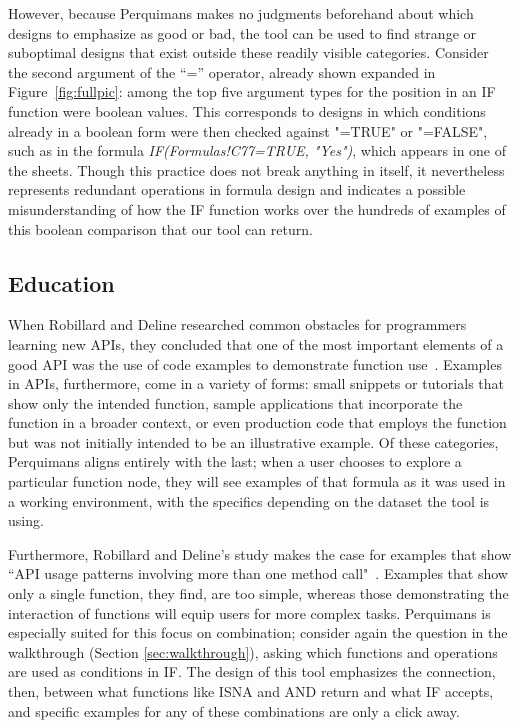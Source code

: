 \documentclass[conference]{IEEEtran}
\newcommand{\toolname}{Perquimans } \newcommand{\toolnameend}{Perquimans}
\begin{document}
	However, because \toolname makes no judgments beforehand about which designs to
	emphasize as good or bad, the tool can be used to find strange or suboptimal
	designs that exist outside these readily visible categories. Consider the second
	argument of the ``='' operator, already shown expanded in
	Figure~\ref{fig:fullpic}: among the top five argument types for the position in
	an IF function were boolean values. This corresponds to designs in which
	conditions already in a boolean form were then checked against "=TRUE" or
	"=FALSE", such as in the formula \textit{IF(Formulas!C77=TRUE, "Yes")}, which
	appears in one of the sheets. Though this practice does not break anything in
	itself, it nevertheless represents redundant operations in formula design and
	indicates a possible misunderstanding of how the IF function works over the
	hundreds of examples of this boolean comparison that our tool can return.
	
	\subsection{Education} When Robillard and Deline researched common obstacles
	for programmers learning new APIs, they concluded that one of the most
	important elements of a good API was the use of code examples to demonstrate
	function use~\cite{robillard2011field}. Examples in APIs, furthermore, come in a variety of forms: small
	snippets or tutorials that show only the intended function, sample applications
	that incorporate the function in a broader context, or even production code
	that employs the function but was not initially intended to be an illustrative
	example. Of these categories, \toolname aligns
	entirely with the last; when a user chooses to explore a particular function
	node, they will see examples of that formula as it was used in a working
	environment, with the specifics depending on the dataset the tool is using.
	\par
	
	Furthermore, Robillard and Deline's study makes the case for examples that show
	``API usage patterns involving more than one method call"~\cite{robillard2011field}. Examples that show only a single function, they
	find, are too simple, whereas those demonstrating the interaction of functions
	will equip users for more complex tasks. \toolname is especially suited for
	this focus on combination; consider again the question in the walkthrough
	(Section \ref{sec:walkthrough}), asking which functions and operations are used
	as conditions in IF. The design of this tool emphasizes the connection, then,
	between what functions like ISNA and AND return and what IF accepts, and
	specific examples for any of these combinations are only a click away.
	
\end{document}
